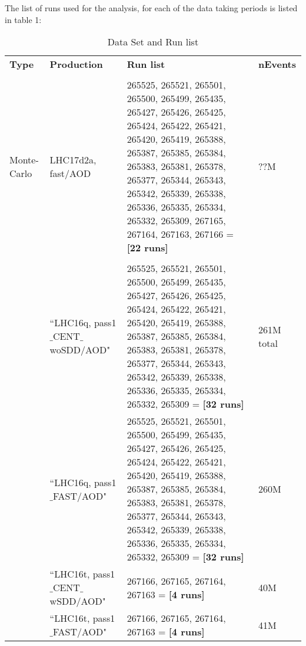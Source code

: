  The list of runs used for the analysis, for each of the data taking  periods is listed in table 1:

 \vspace{10 mm}

\begin{table}[h]
\begin{tabular}{ p{1.2cm} | p{4.2cm} |  p{7cm} |  p{1.2cm}}
{\normalsize \textbf {Type}} &       {\normalsize \textbf {Production}} &       {\normalsize \textbf {Run list}} & {\normalsize \textbf {nEvents}} \\
\\ \hline
Monte-Carlo & LHC17d2a, fast/AOD &265525, 265521, 265501, 265500, 265499, 265435, 265427, 265426, 265425, 265424, 265422, 265421, 265420, 265419, 265388, 265387, 265385, 265384, 265383, 265381, 265378, 265377, 265344, 265343, 265342, 265339, 265338, 265336, 265335, 265334, 265332, 265309, 267165, 267164, 267163, 267166 = \textbf{[22 runs]} & ??M\\
\\ \hline

\multirow{7}{*}{} Data&``LHC16q, pass1$\_$CENT$\_$woSDD/AOD" & 265525, 265521, 265501, 265500, 265499, 265435, 265427, 265426, 265425, 265424, 265422, 265421, 265420, 265419, 265388, 265387, 265385, 265384, 265383, 265381, 265378, 265377, 265344, 265343, 265342, 265339, 265338, 265336, 265335, 265334, 265332, 265309 = \textbf{[32 runs]}& 261M total\\
                  &``LHC16q, pass1$\_$FAST/AOD" &265525, 265521, 265501, 265500, 265499, 265435, 265427, 265426, 265425, 265424, 265422, 265421, 265420, 265419, 265388, 265387, 265385, 265384, 265383, 265381, 265378, 265377, 265344, 265343, 265342, 265339, 265338, 265336, 265335, 265334, 265332, 265309 = \textbf{[32 runs]} & 260M \\
 & ``LHC16t, pass1$\_$CENT$\_$wSDD/AOD" & 267166, 267165, 267164, 267163 = \textbf{[4 runs]} & 40M \\
  & ``LHC16t, pass1$\_$FAST/AOD" & 267166, 267165, 267164, 267163 = \textbf{[4 runs]} & 41M \\
 \hline \hline
\end{tabular}
\\
\caption {Data Set and Run list}
\end{table} 